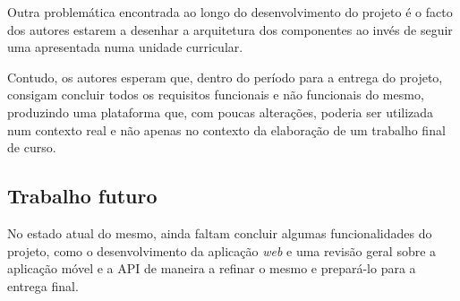 \medskip

Outra problemática encontrada ao longo do desenvolvimento do projeto é o facto dos autores estarem a desenhar a arquitetura dos componentes ao invés de seguir uma apresentada numa unidade curricular.

\medskip

Contudo, os autores esperam que, dentro do período para a entrega do projeto, consigam concluir todos os requisitos funcionais e não funcionais do mesmo, produzindo uma plataforma que, com poucas alterações, poderia ser utilizada num contexto real e não apenas no contexto da elaboração de um trabalho final de curso.


\medskip


\subsection{Trabalho futuro}

No estado atual do mesmo, ainda faltam concluir algumas funcionalidades do projeto, como o desenvolvimento da aplicação \textit{web} e uma revisão geral sobre a aplicação móvel e a API de maneira a refinar o mesmo e prepará-lo para a entrega final.